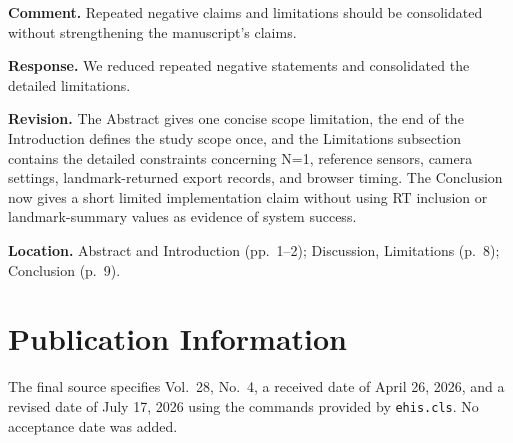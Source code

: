 \documentclass[11pt]{article}
\begin{document}
\textbf{Comment.}
Repeated negative claims and limitations should be consolidated without strengthening the manuscript's claims.

\textbf{Response.}
We reduced repeated negative statements and consolidated the detailed limitations.

\textbf{Revision.}
The Abstract gives one concise scope limitation, the end of the Introduction defines the study scope once, and the Limitations subsection contains the detailed constraints concerning N=1, reference sensors, camera settings, landmark-returned export records, and browser timing.
The Conclusion now gives a short limited implementation claim without using RT inclusion or landmark-summary values as evidence of system success.

\textbf{Location.}
Abstract and Introduction (pp.~1--2); Discussion, Limitations (p.~8); Conclusion (p.~9).

\section*{Publication Information}

The final source specifies Vol.~28, No.~4, a received date of April 26, 2026, and a revised date of July 17, 2026 using the commands provided by \texttt{ehis.cls}.
No acceptance date was added.
\end{document}
